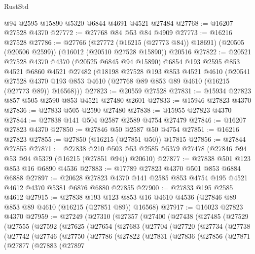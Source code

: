 \begin{lexlean}{RustStd}
\begin{coremodule}
    @94
    @2595
    @15890
    @5320
    @6844
    @4691
    @4521
    @27484
@27768 := @16207 @27528 @4370
@27772 := @27768 @84 @53 @84 @4909
@27773 := @16216 @27528
@27786 := @27766
    (@27772 (@16215 (@27773 @84)) @18691)
    (@20505 (@20506 @2599))
    (@16012 (@20510 @27528 @15890))
    @20516
@27822 := @20521
    @27528
    @4370
    @4370
    (@20525 @6845 @94 @15890)
    @6854
    @193
    @2595
    @853
    @4521
    @6860
    @4521
    @27482
    (@18198
      @27528
      @193
      @853
      @4521
      @4610
      (@20541
        @27528
        @4370
        @193
        @853
        @4610
        (@27768 @89 @853 @89 @4610 (@16215 (@27773 @89)) @16568)))
@27823 := @20559 @27528
@27831 := @15934 @27823 @857 @505 @2590 @853 @4521 @27480 @2601
@27833 := @15946 @27823 @4370
@27836 := @27833 @505 @2590 @27480
@27838 := @15955 @27823 @4370
@27844 := @27838 @141 @504 @2587 @2589 @4754 @27479
@27846 := @16207 @27823 @4370
@27850 := @27846 @50 @2587 @50 @4754
@27851 := @16216 @27823
@27855 := @27850 (@16215 (@27851 @50)) @17815
@27856 := @27844 @27855
@27871 := @27838
    @210
    @503
    @53
    @2585
    @5379
    @27478
    (@27846 @94 @53 @94 @5379 (@16215 (@27851 @94)) @20610)
@27877 := @27838 @501 @123 @853 @16 @6890 @4536
@27883 := @17789 @27823 @4370 @501 @853 @6884 @6888
@27897 := @20628 @27823 @4370 @141 @2585 @853 @4754 @195 @4521 @4612 @4370 @5381 @6876 @6880 @27855
@27900 := @27833 @195 @2585 @4612
@27915 := @27838
    @193
    @123
    @853
    @16
    @4610
    @4536
    (@27846 @89 @853 @89 @4610 (@16215 (@27851 @89)) @16568)
@27917 := @16023 @27823 @4370
@27959 := @27249
    (@27310
      (@27357
        (@27400
          (@27438
            (@27485
              (@27529
                (@27555
                  (@27592
                    (@27625
                      (@27654
                        (@27683
                          (@27704
                            (@27720
                              (@27734
                                (@27738
                                  (@27742
                                    (@27746
                                      (@27750
                                        (@27786
                                          (@27822
                                            (@27831
                                              (@27836
                                                (@27856
                                                  (@27871
                                                    (@27877
                                                      (@27883
                                                        (@27897

\end{coremodule}
\end{lexlean}
